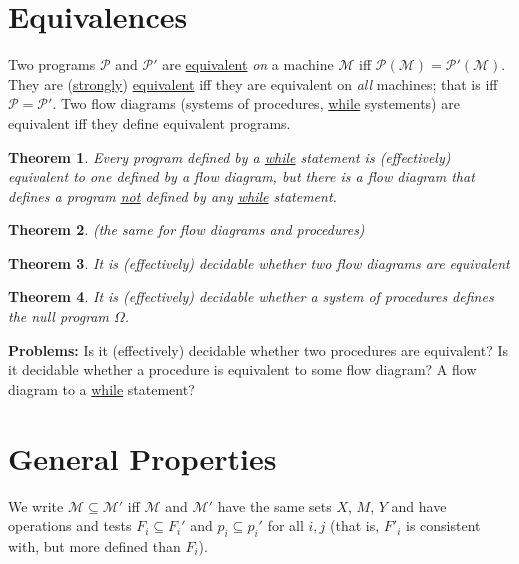 \documentclass{article}
\newtheorem{theorem}{Theorem}
\newcommand{\scM}{\mathscr{M}}
\newcommand{\scP}{\mathscr{P}}
\begin{document}
\section{Equivalences}
Two programs $\scP$ and $\scP'$ are \underline{equivalent} \textit{on} a machine $\scM$ iff $\scP(\scM) = \scP'(\scM)$. They are (\underline{strongly}) \underline{equivalent} iff they are equivalent on \textit{all} machines; that is iff $\scP = \scP'$. Two flow diagrams (systems of procedures, \underline{while} systements) are equivalent iff they define equivalent programs.

\begin{theorem}
    Every program defined by a \underline{while} statement is (effectively) equivalent to one defined by a flow diagram, \textit{but} there is a flow diagram that defines a program \underline{\underline{not}} defined by any \underline{while} statement. 
\end{theorem}

\begin{theorem}
    (the same for flow diagrams and procedures)
\end{theorem}

\begin{theorem}
    It is (effectively) decidable whether two flow diagrams are equivalent
\end{theorem}

\begin{theorem}
    It is (effectively) decidable whether a system of procedures defines the null program $\Omega$.
\end{theorem}

\noindent\textbf{Problems:} Is it (effectively) decidable whether two procedures are equivalent? Is it decidable whether a procedure is equivalent to some flow diagram? A flow diagram to a \underline{while} statement?

\section{General Properties}

We write $\scM \subseteq \scM'$ iff $\scM$ and $\scM'$ have the same sets $X$, $M$, $Y$ and have operations and tests $F_i \subseteq F_i'$ and $p_i \subseteq p_i'$ for all $i, j$ (that is, $F'_i$ is consistent with, but more defined than $F_i$). 
\end{document}
